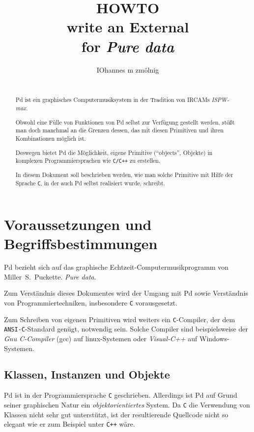 \documentclass[12pt, a4paper,austrian, titlepage]{article}
\title{
HOWTO \\
write an External \\
for {\em Pure data}
}
\author{
IOhannes m zmölnig \\
\\
{\em
\latexhtml{institut für elektronische musik und akustik}
{\htmladdnormalink{institut für elektronische musik und akustik}{http://iem.at}}
}
}
\date{}
\begin{document}
\maketitle


\begin{abstract}
Pd ist ein graphisches Computermusiksystem in der Tradition von IRCAMs {\em ISPW-max}.

Obwohl eine Fülle von Funktionen von Pd selbst zur Verfügung gestellt 
werden, stößt man doch manchmal an die Grenzen dessen,
das mit diesen Primitiven und ihren Kombinationen möglich ist.

Deswegen bietet Pd die Möglichkeit, eigene Primitive (``objects'', Objekte) in komplexen
Programmiersprachen wie {\tt C/C++} zu erstellen.

In diesem Dokument soll beschrieben werden, wie man solche Primitive mit Hilfe der 
Sprache {\tt C}, in der auch Pd selbst realisiert wurde, schreibt.
\end{abstract}


\vfill
\newpage

\tableofcontents

\vfill
\newpage

\section{Voraussetzungen und Begriffsbestimmungen}

Pd bezieht sich auf das graphische Echtzeit-Computermusikprogramm von
Miller~S.~Puckette.
{\em Pure data}.

Zum Verständnis dieses Dokumentes wird der Umgang mit Pd sowie
Verständnis von Programmiertechniken, insbesondere {\tt C} vorausgesetzt.

Zum Schreiben von eigenen Primitiven wird weiters ein {\tt C}-Compiler,
der dem {\tt ANSI-C}-Standard genügt, notwendig sein.
Solche Compiler sind beispielsweise der {\em Gnu C-Compiler} (gcc) auf linux-Systemen oder
{\em Visual-C++} auf Windows-Systemen.

\subsection{Klassen, Instanzen und Objekte}
Pd ist in der Programmiersprache {\tt C} geschrieben.
Allerdings ist Pd auf Grund seiner graphischen Natur ein {\em objektorientiertes} System.
Da {\tt C} die Verwendung von Klassen nicht sehr gut unterstützt, ist der resultierende
Quellcode nicht so elegant wie er zum Beispiel unter {\tt C++} wäre.
\end{document}
